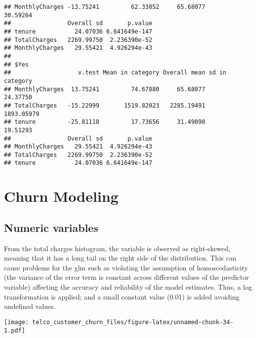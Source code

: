 \documentclass[
  a4paper]{article}
\newenvironment{Shaded}{\begin{snugshade}}{\end{snugshade}}
\newcommand{\AttributeTok}[1]{\textcolor[rgb]{0.13,0.29,0.53}{#1}}
\newcommand{\FunctionTok}[1]{\textcolor[rgb]{0.13,0.29,0.53}{\textbf{#1}}}
\newcommand{\NormalTok}[1]{#1}
\newcommand{\SpecialCharTok}[1]{\textcolor[rgb]{0.81,0.36,0.00}{\textbf{#1}}}
\newcommand{\StringTok}[1]{\textcolor[rgb]{0.31,0.60,0.02}{#1}}
\begin{document}
\begin{verbatim}
## MonthlyCharges -13.75241         62.33852     65.68077       30.59264
##                Overall sd       p.value
## tenure           24.07036 6.641649e-147
## TotalCharges   2269.99750  2.236390e-52
## MonthlyCharges   29.55421  4.926294e-43
## 
## $Yes
##                   v.test Mean in category Overall mean sd in category
## MonthlyCharges  13.75241         74.67880     65.68077       24.37750
## TotalCharges   -15.22999       1519.82023   2285.19491     1893.05979
## tenure         -25.81118         17.73656     31.49090       19.51293
##                Overall sd       p.value
## MonthlyCharges   29.55421  4.926294e-43
## TotalCharges   2269.99750  2.236390e-52
## tenure           24.07036 6.641649e-147
\end{verbatim}

\hypertarget{churn-modeling}{%
\section{Churn Modeling}\label{churn-modeling}}

\hypertarget{numeric-variables}{%
\subsection{Numeric variables}\label{numeric-variables}}

From the total charges histogram, the variable is observed as
right-skewed, meaning that it has a long tail on the right side of the
distribution. This can cause problems for the glm such as violating the
assumption of homoscedasticity (the variance of the error term is
constant across different values of the predictor variable) affecting
the accuracy and reliability of the model estimates. Thus, a log
transformation is applied; and a small constant value (0.01) is added
avoiding undefined values.

\begin{Shaded}
\end{Shaded}

\texttt{[image: telco\_customer\_churn\_files/figure-latex/unnamed-chunk-34-1.pdf]}
\end{document}
